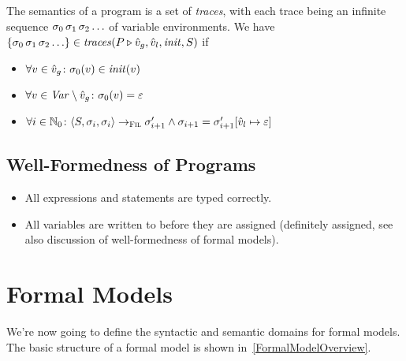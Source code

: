 \documentclass[a4paper,10pt,english]{article}
\begin{document}
\begin{samepage}
	The semantics of a \Fil program is a set of \textit{traces}, with each trace being an infinite sequence $\sigma_0 \,
	\sigma_1 \, \sigma_2 \ldots$ of variable environments. We have $\{ \sigma_0 \, \sigma_1 \, \sigma_2 \ldots \}
	\in \mathit{traces}(P \triangleright \hat{v}_g, \hat{v}_l, \mathit{init}, S)$ if
	\begin{itemize}
		\item $\forall v \in \hat{v}_g \colon \sigma_0(v) \in \mathit{init}(v)$
		\item $\forall v \in \mathit{Var} \setminus \hat{v}_g \colon \sigma_0(v) = \varepsilon$
		\item $\forall i \in \mathbb{N}_0 \colon \langle S, \sigma_i, \sigma_i \rangle \rightarrow_{\textsc{Fil}}
		\sigma_{i+1}' \wedge \sigma_{i+1} = \sigma_{i + 1}'[\hat{v}_l \mapsto \varepsilon]$
	\end{itemize}
\end{samepage}

\subsection{Well-Formedness of \Fil Programs}
\begin{itemize}
	\item All expressions and statements are typed correctly.
	\item All variables are written to before they are assigned (definitely assigned, see also discussion of well-formedness of
	formal models).
\end{itemize}

\section{Formal Models}
We're now going to define the syntactic and semantic
domains for formal models. The basic structure of a formal model is shown in~\cref{FormalModelOverview}.
\end{document}
